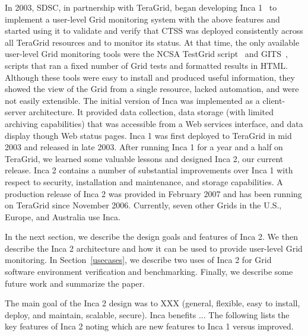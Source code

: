 \documentclass[times,10pt,twocolumn]{article}
\begin{document}
In 2003, SDSC, in partnership with TeraGrid, began developing Inca
1~\cite{inca1} to implement a user-level Grid monitoring system with the above
features and started using it to validate and
verify that CTSS was deployed consistently across all TeraGrid resources and
to monitor its status.  At that time, the only available user-level Grid
monitoring tools were the NCSA TestGrid script~\cite{ncsa-test} and
GITS~\cite{gits}, scripts that ran a fixed number of Grid tests and formatted
results in HTML.  Although these tools were easy to install and produced
useful information, they showed the view of the Grid from a single
resource, lacked automation, and were not easily extensible.  The initial
version of Inca was implemented as a client-server architecture.  It provided
data collection, data storage (with limited archiving capabilities) that was
accessible from a Web services interface, and data display though Web status
pages.  Inca 1 was first deployed to TeraGrid in mid 2003 and released in late
2003. After running Inca 1 for a year and a half on TeraGrid, we learned some
valuable lessons and designed Inca 2, our current release.  Inca 2
contains a number of substantial improvements over Inca 1 with respect to
security, installation and maintenance, and storage capabilities.  A
production release of Inca 2 was provided in February 2007 and has been
running on TeraGrid since November 2006.  Currently, seven other Grids in the
U.S., Europe, and Australia use Inca.  

In the next section, we describe the design goals and features of Inca 2. 
We then describe the Inca 2 architecture and how it can be used to provide
user-level Grid monitoring.  In Section~\ref{usecases}, we describe two 
uses of Inca 2 for Grid software environment verification and benchmarking.  
Finally, we describe some future work and summarize the paper.

  
The main goal of the Inca 2 design was to XXX (general, flexible, easy to
install, deploy, and
maintain, scalable, secure).
Inca benefits ...
The following lists the key features of Inca 2 noting which are new features
to Inca 1 versus improved.
\end{document}
